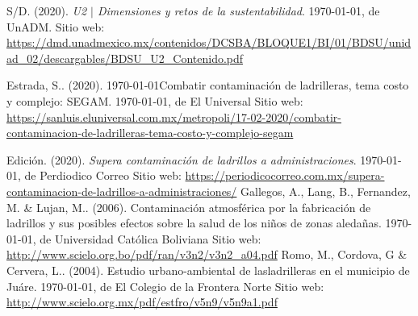 \documentclass[12pt]{article}
\begin{document}
\newpage
\begin{thebibliography}{X}
	
	 S/D. (2020). \textit{U2 $|$ Dimensiones y retos de la sustentabilidad}. \today, de UnADM. Sitio web: \url{https://dmd.unadmexico.mx/contenidos/DCSBA/BLOQUE1/BI/01/BDSU/unidad_02/descargables/BDSU_U2_Contenido.pdf} 
	
	 Estrada, S.. (2020). \today{Combatir contaminación de ladrilleras, tema costo y complejo: SEGAM}. \today, de El Universal Sitio web: \url{https://sanluis.eluniversal.com.mx/metropoli/17-02-2020/combatir-contaminacion-de-ladrilleras-tema-costo-y-complejo-segam}
	
	 Edición. (2020). {\it Supera contaminación de ladrillos a administraciones}. \today, de Perdiodico Correo Sitio web: \url{https://periodicocorreo.com.mx/supera-contaminacion-de-ladrillos-a-administraciones/}
	 Gallegos, A., Lang, B., Fernandez, M. \& Lujan, M.. (2006). Contaminaci\'on atmosf\'erica por la fabricaci\'on de ladrillos y sus posibles efectos sobre la salud de los ni\~nos de zonas aledañas. \today, de Universidad Cat\'olica Boliviana Sitio web: \url{http://www.scielo.org.bo/pdf/ran/v3n2/v3n2_a04.pdf}
	 Romo, M., Cordova, G \& Cervera, L.. (2004). Estudio urbano-ambiental de lasladrilleras en el municipio de Juáre. \today, de El Colegio de la Frontera Norte Sitio web: \url{http://www.scielo.org.mx/pdf/estfro/v5n9/v5n9a1.pdf}

\end{thebibliography}
\end{document}
